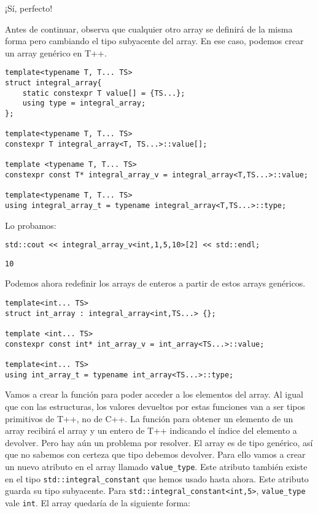 \documentclass[11pt]{article}
\begin{document}
¡Sí, perfecto!

Antes de continuar, observa que cualquier otro array se definirá de la misma forma pero cambiando el tipo subyacente del array. En ese caso, podemos crear un array genérico en T++.

\begin{verbatim}
template<typename T, T... TS>
struct integral_array{
	static constexpr T value[] = {TS...};
	using type = integral_array;
};

template<typename T, T... TS>
constexpr T integral_array<T, TS...>::value[];

template <typename T, T... TS>
constexpr const T* integral_array_v = integral_array<T,TS...>::value;

template<typename T, T... TS>
using integral_array_t = typename integral_array<T,TS...>::type;
\end{verbatim}

Lo probamos:

\begin{verbatim}
std::cout << integral_array_v<int,1,5,10>[2] << std::endl;
\end{verbatim}

\begin{verbatim}
10
\end{verbatim}


Podemos ahora redefinir los arrays de enteros a partir de estos arrays genéricos.

\begin{verbatim}
template<int... TS>
struct int_array : integral_array<int,TS...> {};

template <int... TS>
constexpr const int* int_array_v = int_array<TS...>::value;

template<int... TS>
using int_array_t = typename int_array<TS...>::type;
\end{verbatim}

Vamos a crear la función para poder acceder a los elementos del array. Al igual que con las estructuras, los valores devueltos por estas funciones van a ser tipos primitivos de T++, no de C++. La función para obtener un elemento de un array recibirá el array y un entero de T++ indicando el índice del elemento a devolver. Pero hay aún un problema por resolver. El array es de tipo genérico, así que no sabemos con certeza que tipo debemos devolver. Para ello vamos a crear un nuevo atributo en el array llamado \texttt{value\_type}. Este atributo también existe en el tipo \texttt{std::integral\_constant} que hemos usado hasta ahora. Este atributo guarda su tipo subyacente. Para \texttt{std::integral\_constant<int,5>}, \texttt{value\_type} vale \texttt{int}. El array quedaría de la siguiente forma:
\end{document}
